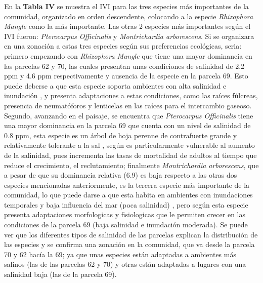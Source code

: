 \documentclass[conference,final,12pt,]{IEEEtran}
\begin{document}
En la \textbf{Tabla IV} se muestra el IVI para las tres especies más
importantes de la comunidad, organizado en orden descendente, colocando
a la especie \emph{Rhizophora Mangle} como la más importante. Las otras
2 especies más importantes según el IVI fueron: \emph{Pterocarpus
Officinalis} y \emph{Montrichardia arborescens}. Si se organizara en una
zonación a estas tres especies según sus preferencias ecológicas, seria:
primero empezando con \emph{Rhizophora Mangle} que tiene una mayor
dominancia en las parcelas 62 y 70, las cuales presentan unas
condiciones de salinidad de 2.2 ppm y 4.6 ppm respectivamente y ausencia
de la especie en la parcela 69. Esto puede deberse a que esta especie
soporta ambientes con alta salinidad e inundación \citep{AF}, y presenta
adaptaciones a estas condiciones, como las raíces fúlcreas, presencia de
neumatóforos \citep{AF} y lenticelas en las raíces para el intercambio
gaseoso. Segundo, avanzando en el paisaje, se encuentra que
\emph{Pterocarpus Officinalis} tiene una mayor dominancia en la parcela
69 que cuenta con un nivel de salinidad de 0.8 ppm, esta especie es un
árbol de hoja perenne de contrafuerte grande y relativamente tolerante a
la sal \citep{AG}, según \citep{AH}es particularmente vulnerable al
aumento de la salinidad, pues incrementa las tasas de mortalidad de
adultos al tiempo que reduce el crecimiento, el reclutamiento;
finalmente \emph{Montrichardia arborescens}, que a pesar de que su
dominancia relativa (6.9) es baja respecto a las otras dos especies
mencionadas anteriormente, es la tercera especie más importante de la
comunidad, lo que puede darse a que esta habita en ambientes con
inundaciones temporales y baja influencia del mar (poca salinidad)
\citep{AI}, pero según \citep{AI} esta especie presenta adaptaciones
morfologicas y fisiologicas que le permiten crecer en las condiciones de
la parcela 69 (baja salinidad e inundación moderada). Se puede ver que
los diferentes tipos de salinidad de las parcelas explican la
distribución de las especies y se confirma una zonación en la comunidad,
que va desde la parcela 70 y 62 hacía la 69; ya que unas especies están
adaptadas a ambientes más salinos (las de las parcelas 62 y 70) y otras
están adaptadas a lugares con una salinidad baja (las de la parcela 69).
\end{document}
